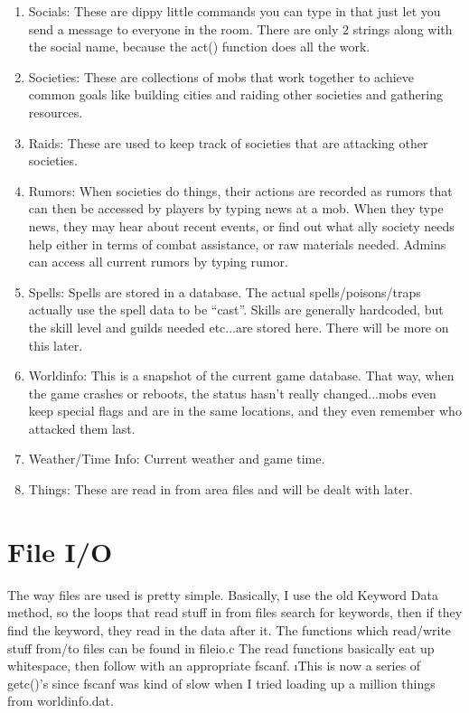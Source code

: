 \begin{enumerate}
\item Socials: These are dippy little commands you can type in that
just let you send a message to everyone in the room. There are only 2
strings along with the social name, because the act() function does
all the work.

\item Societies: These are collections of mobs that work together to
achieve common goals like building cities and raiding other societies
and gathering resources.

\item Raids: These are used to keep track of societies that are
attacking other societies.

\item Rumors: When societies do things, their actions are recorded as
rumors that can then be accessed by players by typing news at a
mob. When they type news, they may hear about recent events, or find
out what ally society needs help either in terms of combat assistance,
or raw materials needed. Admins can access all current rumors by
typing rumor.

\item Spells: Spells are stored in a database. The actual
spells/poisons/traps actually use the spell data to be
``cast''. Skills are generally hardcoded, but the skill level and
guilds needed etc...are stored here. There will be more on this later.

\item Worldinfo: This is a snapshot of the current game database. That
way, when the game crashes or reboots, the status hasn't really
changed...mobs even keep special flags and are in the same locations,
and they even remember who attacked them last.

\item Weather/Time Info: Current weather and game time.

\item Things: These are read in from area files and will be dealt with later.

\end{enumerate}

        
\section{File I/O}

The way files are used is pretty simple. Basically, I use the old
Keyword Data method, so the loops that read stuff in from files search
for keywords, then if they find the keyword, they read in the data
after it. The functions which read/write stuff from/to files can be
found in fileio.c The read functions basically eat up whitespace, then
follow with an appropriate fscanf. {\i{This is now a series of
getc()'s since fscanf was kind of slow when I tried loading up a
million things from worldinfo.dat.}}    

